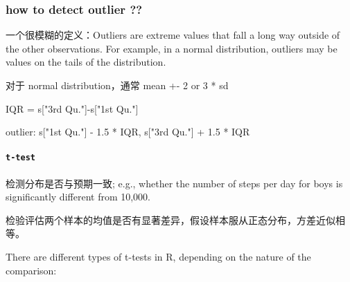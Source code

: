 \documentclass[
]{article}
\begin{document}
\hypertarget{how-to-detect-outlier-}{%
\subsubsection{how to detect outlier ??}\label{how-to-detect-outlier-}}

一个很模糊的定义：Outliers are extreme values that fall a long way
outside of the other observations. For example, in a normal
distribution, outliers may be values on the tails of the distribution.

对于 normal distribution，通常 mean +- 2 or 3 * sd

IQR = s{[}"3rd Qu."{]}-s{[}"1st Qu."{]}

outlier: s{[}"1st Qu."{]} - 1.5 * IQR, s{[}"3rd Qu."{]} + 1.5 * IQR

\hypertarget{t-test}{%
\paragraph{\texorpdfstring{\texttt{t-test}}{t-test}}\label{t-test}}

检测分布是否与预期一致; e.g., whether the number of steps per day for
boys is significantly different from 10,000.

检验评估两个样本的均值是否有显著差异，假设样本服从正态分布，方差近似相等。

There are different types of t-tests in R, depending on the nature of
the comparison:
\end{document}
